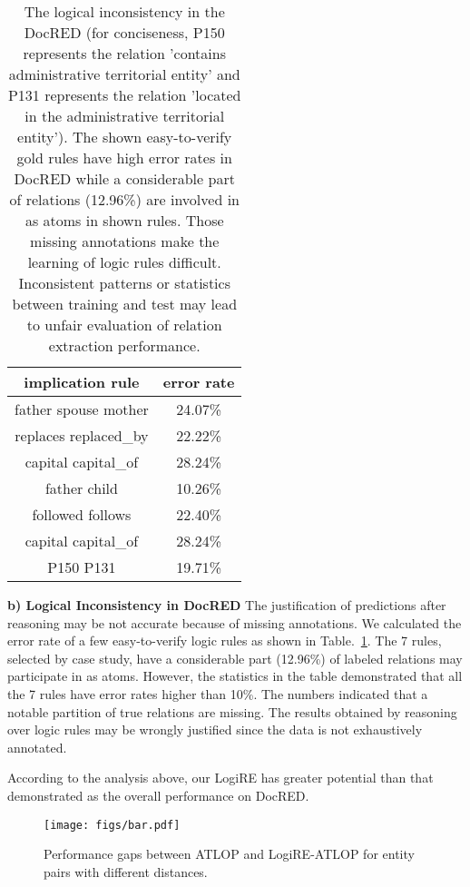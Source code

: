 \documentclass[11pt]{article}
\newcommand{\mymodel}{LogiRE\xspace}
\begin{document}
\begin{table}[t]
    \centering
    \small
    \begin{tabular}{cc}
    \toprule
        implication rule & error rate \\ \midrule
        father spouse mother & 24.07\% \\
        replaces replaced\_by & 22.22\% \\
        capital capital\_of & 28.24\% \\
        father child & 10.26\% \\
        followed follows & 22.40\% \\
        capital capital\_of & 28.24\% \\
        P150 P131 & 19.71\% \\
    \bottomrule
    \end{tabular}
    \caption{The logical inconsistency in the DocRED (for conciseness, P150 represents the relation 'contains administrative territorial entity' and P131 represents the relation 'located in the administrative territorial entity'). The shown easy-to-verify gold rules have high error rates in DocRED while a considerable part of relations (12.96\%) are involved in as atoms in shown rules. Those missing annotations make the learning of logic rules difficult. Inconsistent patterns or statistics between training and test may lead to unfair evaluation of relation extraction performance.}
    \label{tab:docred-logic}
\end{table}

\textbf{b) Logical Inconsistency in DocRED}
The justification of predictions after reasoning may be not accurate because of missing annotations. We calculated the error rate of a few easy-to-verify logic rules as shown in Table.~\ref{tab:docred-logic}. The 7 rules, selected by case study, have a considerable part (12.96\%) of labeled relations may participate in as atoms. However, the statistics in the table demonstrated that all the 7 rules have error rates higher than 10\%. The numbers indicated that a notable partition of true relations are missing. The results obtained by reasoning over logic rules may be wrongly justified since the data is not exhaustively annotated.

According to the analysis above, our \mymodel has greater potential than that demonstrated as the overall performance on DocRED.

\begin{figure}
    \centering
    \texttt{[image: figs/bar.pdf]}
    \caption{Performance gaps between ATLOP and \mymodel-ATLOP for entity pairs with different distances.}
    \label{fig:distance}
\end{figure}
\end{document}
